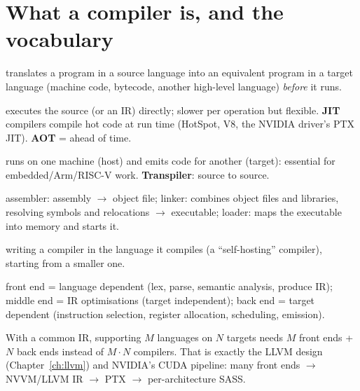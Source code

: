 \documentclass[10pt,a4paper,openany,oneside]{report}
\newcommand{\prio}[1]{\texorpdfstring{\ifcase#1\or{\color{gold}\ding{72}}\or{\color{gold}\ding{72}\ding{72}}\or{\color{gold}\ding{72}\ding{72}\ding{72}}\fi}{}}
\begin{document}
\section{What a compiler is, and the vocabulary \prio{3}}
\begin{defbox}
\begin{description}[leftmargin=0pt,itemsep=1pt,labelindent=0pt]
\item[Compiler] translates a program in a source language into an equivalent program in a target language (machine code, bytecode, another high-level language) \emph{before} it runs.
\item[Interpreter] executes the source (or an IR) directly; slower per operation but flexible. \textbf{JIT} compilers compile hot code at run time (HotSpot, V8, the NVIDIA driver's PTX JIT). \textbf{AOT} = ahead of time.
\item[Cross-compiler] runs on one machine (host) and emits code for another (target): essential for embedded/Arm/RISC-V work. \textbf{Transpiler}: source to source.
\item[Assembler / linker / loader] assembler: assembly $\to$ object file; linker: combines object files and libraries, resolving symbols and relocations $\to$ executable; loader: maps the executable into memory and starts it.
\item[Bootstrapping] writing a compiler in the language it compiles (a ``self-hosting'' compiler), starting from a smaller one.
\item[Front end / middle end / back end] front end = language dependent (lex, parse, semantic analysis, produce IR); middle end = IR optimisations (target independent); back end = target dependent (instruction selection, register allocation, scheduling, emission).
\end{description}
\end{defbox}
\begin{mustbox}
With a common IR, supporting $M$ languages on $N$ targets needs $M$ front ends + $N$ back ends instead of $M\cdot N$ compilers. That is exactly the LLVM design (Chapter~\ref{ch:llvm}) and NVIDIA's CUDA pipeline: many front ends $\to$ NVVM/LLVM IR $\to$ PTX $\to$ per-architecture SASS.
\end{mustbox}
\end{document}
